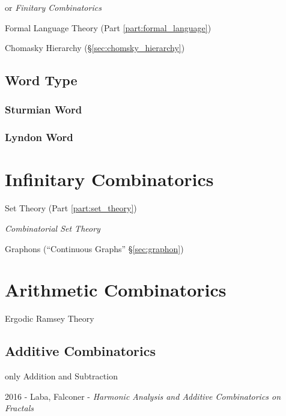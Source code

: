 or \emph{Finitary Combinatorics}

Formal Language Theory (Part \ref{part:formal_language})

Chomasky Hierarchy (\S\ref{sec:chomsky_hierarchy})



\subsection{Word Type}\label{sec:word_type}

\subsubsection{Sturmian Word}\label{sec:sturmian_word}

\subsubsection{Lyndon Word}\label{sec:lyndon_word}



\section{Infinitary Combinatorics}\label{sec:infinitary_combinatorics}

Set Theory (Part \ref{part:set_theory})

\emph{Combinatorial Set Theory}

Graphons (``Continuous Graphs'' \S\ref{sec:graphon})



\section{Arithmetic Combinatorics}\label{sec:arithmetic_combinatorics}

Ergodic Ramsey Theory



\subsection{Additive Combinatorics}\label{sec:additive_combinatorics}

only Addition and Subtraction

2016 - Laba, Falconer - \emph{Harmonic Analysis and Additive Combinatorics on
  Fractals}
